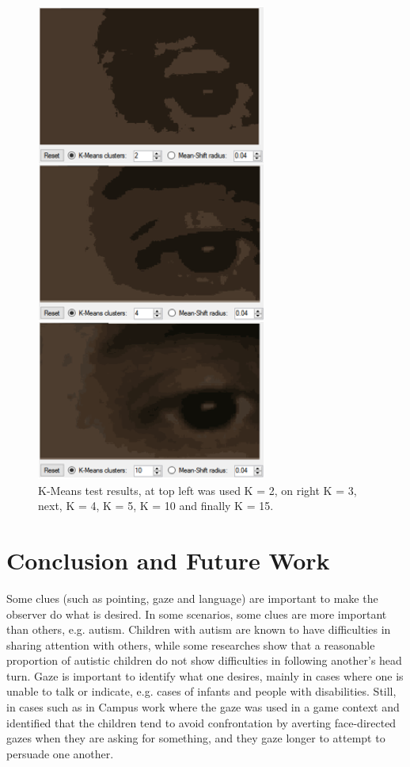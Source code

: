 \documentclass[10pt, conference]{IEEEtran}
\begin{document}
\begin{figure}[t]
	\centering
	\includegraphics{figures/pic14.png}
    \caption{K-Means test results, at top left was used K = 2, on right K = 3, next, K = 4, K = 5, K = 10 and finally K = 15.}
    \label{fig:fig14}
\end{figure}

\section{Conclusion and Future Work} \label{sec:conclusionAndFutureWork}
	Some clues (such as pointing, gaze and language) are important to make the observer do what is desired. 
	In some scenarios, some clues are more important than others, e.g. autism.
	Children with autism are known to have difficulties in sharing attention with others, while some researches \cite{14} show that a reasonable proportion of autistic children do not show difficulties in following another's head turn.
	Gaze is important to identify what one desires, mainly in cases where one is unable to talk or indicate, e.g. cases of infants and people with disabilities.
	Still, in cases such as in Campus work where the gaze was used in a game context and identified that the children tend to avoid confrontation by averting face-directed gazes when they are asking for something, and they gaze longer to attempt to persuade one another.
\end{document}
